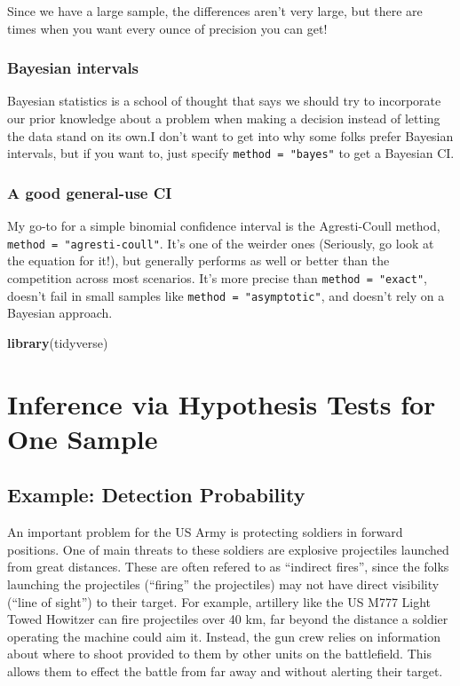 \documentclass[
]{book}
\newenvironment{Shaded}{\begin{snugshade}}{\end{snugshade}}
\newcommand{\KeywordTok}[1]{\textcolor[rgb]{0.13,0.29,0.53}{\textbf{#1}}}
\newcommand{\NormalTok}[1]{#1}
\theoremstyle{definition}
\theoremstyle{definition}
\theoremstyle{definition}
\theoremstyle{remark}
\begin{document}
Since we have a large sample, the differences aren't very large, but there are times when you want every ounce of precision you can get!

\hypertarget{bayesian-intervals}{%
\subsection{Bayesian intervals}\label{bayesian-intervals}}

Bayesian statistics is a school of thought that says we should try to incorporate our prior knowledge about a problem when making a decision instead of letting the data stand on its own.I don't want to get into why some folks prefer Bayesian intervals, but if you want to, just specify \texttt{method\ =\ "bayes"} to get a Bayesian CI.

\hypertarget{a-good-general-use-ci}{%
\subsection{A good general-use CI}\label{a-good-general-use-ci}}

My go-to for a simple binomial confidence interval is the Agresti-Coull method, \texttt{method\ =\ "agresti-coull"}. It's one of the weirder ones (Seriously, go look at the equation for it!), but generally performs as well or better than the competition across most scenarios. It's more precise than \texttt{method\ =\ "exact"}, doesn't fail in small samples like \texttt{method\ =\ "asymptotic"}, and doesn't rely on a Bayesian approach.

\begin{Shaded}
\begin{Highlighting}[]
\KeywordTok{library}\NormalTok{(tidyverse)}
\end{Highlighting}
\end{Shaded}

\hypertarget{HT}{%
\chapter{Inference via Hypothesis Tests for One Sample}\label{HT}}

\hypertarget{example-detection-probability}{%
\section{Example: Detection Probability}\label{example-detection-probability}}

An important problem for the US Army is protecting soldiers in forward positions. One of main threats to these soldiers are explosive projectiles launched from great distances. These are often refered to as ``indirect fires'', since the folks launching the projectiles (``firing'' the projectiles) may not have direct visibility (``line of sight'') to their target. For example, artillery like the US M777 Light Towed Howitzer can fire projectiles over 40 km, far beyond the distance a soldier operating the machine could aim it. Instead, the gun crew relies on information about where to shoot provided to them by other units on the battlefield. This allows them to effect the battle from far away and without alerting their target.
\end{document}
